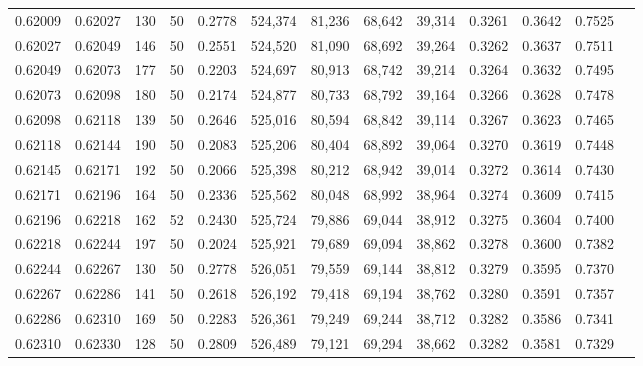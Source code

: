 \begin{tabular}{rrrrrrrrrrrrr}
0.62009 & 0.62027 &   130 &  50 &                                     0.2778 & 524,374 &  81,236 &  68,642 &  39,314 & 0.3261 & 0.3642 & 0.7525 \\
0.62027 & 0.62049 &   146 &  50 &                                     0.2551 & 524,520 &  81,090 &  68,692 &  39,264 & 0.3262 & 0.3637 & 0.7511 \\
0.62049 & 0.62073 &   177 &  50 &                                     0.2203 & 524,697 &  80,913 &  68,742 &  39,214 & 0.3264 & 0.3632 & 0.7495 \\
0.62073 & 0.62098 &   180 &  50 &                                     0.2174 & 524,877 &  80,733 &  68,792 &  39,164 & 0.3266 & 0.3628 & 0.7478 \\
0.62098 & 0.62118 &   139 &  50 &                                     0.2646 & 525,016 &  80,594 &  68,842 &  39,114 & 0.3267 & 0.3623 & 0.7465 \\
0.62118 & 0.62144 &   190 &  50 &                                     0.2083 & 525,206 &  80,404 &  68,892 &  39,064 & 0.3270 & 0.3619 & 0.7448 \\
0.62145 & 0.62171 &   192 &  50 &                                     0.2066 & 525,398 &  80,212 &  68,942 &  39,014 & 0.3272 & 0.3614 & 0.7430 \\
0.62171 & 0.62196 &   164 &  50 &                                     0.2336 & 525,562 &  80,048 &  68,992 &  38,964 & 0.3274 & 0.3609 & 0.7415 \\
0.62196 & 0.62218 &   162 &  52 &                                     0.2430 & 525,724 &  79,886 &  69,044 &  38,912 & 0.3275 & 0.3604 & 0.7400 \\
0.62218 & 0.62244 &   197 &  50 &                                     0.2024 & 525,921 &  79,689 &  69,094 &  38,862 & 0.3278 & 0.3600 & 0.7382 \\
0.62244 & 0.62267 &   130 &  50 &                                     0.2778 & 526,051 &  79,559 &  69,144 &  38,812 & 0.3279 & 0.3595 & 0.7370 \\
0.62267 & 0.62286 &   141 &  50 &                                     0.2618 & 526,192 &  79,418 &  69,194 &  38,762 & 0.3280 & 0.3591 & 0.7357 \\
0.62286 & 0.62310 &   169 &  50 &                                     0.2283 & 526,361 &  79,249 &  69,244 &  38,712 & 0.3282 & 0.3586 & 0.7341 \\
0.62310 & 0.62330 &   128 &  50 &                                     0.2809 & 526,489 &  79,121 &  69,294 &  38,662 & 0.3282 & 0.3581 & 0.7329 \\

\end{tabular}
